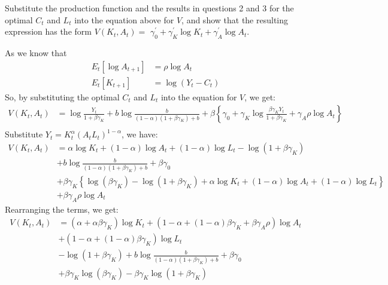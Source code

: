 \begin{problem}[4]
    Substitute the production function and the results in questions 2 and 3 for the optimal $C_t$ and $L_t$ into the equation above for $V$, and show that the resulting expression has the form $V(K_t,A_t)=$ $\gamma_0^{\prime}+\gamma_K^{\prime}\log K_t+\gamma_A^{\prime}\log A_t.$
\end{problem}

\begin{solution}
    As we know that
    \begin{align*}
        E_t\left[\log A_{t+1}\right] &= \rho\log A_t \\
        E_t\left[K_{t+1} \right] &= \log{(Y_t - C_t)}
    \end{align*}
    So, by substituting the optimal $C_t$ and $L_t$ into the equation for $V$, we get:
    \begin{align*}
        V(K_t, A_t) &= \log{\frac{Y_t}{1+\beta \gamma_K}} + b\log{\frac{b}{(1-\alpha)(1 + \beta \gamma_K) + b}} + \beta \left\{ \gamma_0 + \gamma_K \log{\frac{\beta \gamma_K Y_t}{1 + \beta \gamma_K}} + \gamma_A \rho \log{A_t} \right\} \\
    \end{align*}
    Substitute $Y_t = K_t^{\alpha }(A_t L_t)^{1-\alpha }$, we have:
    \begin{align*}
        V(K_t, A_t) &= \alpha \log{K_t} + (1-\alpha )\log{A_t} + (1-\alpha )\log{L_t} - \log{(1+\beta \gamma_K)} \\
        &+ b\log{\frac{b}{(1-\alpha)(1 + \beta \gamma_K) + b}} + \beta \gamma_0  \\
        &+ \beta \gamma_K\left\{\log{(\beta \gamma_K)} -\log{(1+\beta  \gamma_K)} + \alpha \log{K_t} + (1-\alpha )\log{A_t} + (1-\alpha )\log{L_t} \right\} \\
        &+ \beta \gamma_A \rho \log{A_t}
    \end{align*}
    Rearranging the terms, we get:
    \begin{align*}
        V(K_t, A_t) &= (\alpha +\alpha \beta \gamma_K)\log{K_t} + (1-\alpha + (1-\alpha )\beta \gamma_K + \beta \gamma_A \rho)\log{A_t} \\
        &+ (1-\alpha + (1-\alpha )\beta \gamma_K)\log{L_t} \\
        &- \log{(1+\beta \gamma_K)} + b\log{\frac{b}{(1-\alpha)(1 + \beta \gamma_K) + b}} + \beta \gamma_0  \\
        &+ \beta \gamma_K\log{(\beta \gamma_K)} - \beta \gamma_K\log{(1+\beta  \gamma_K)}
    \end{align*}

\end{solution}
